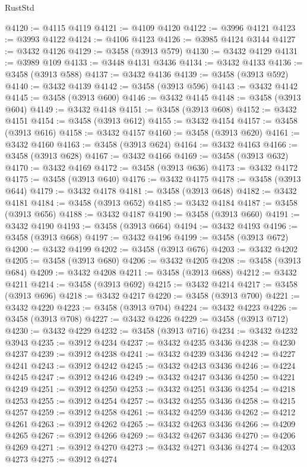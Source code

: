 \begin{lexlean}{RustStd}
\begin{coremodule}
@4120 := @4115 @4119
@4121 := @4109 @4120
@4122 := @3996 @4121
@4123 := @3993 @4122
@4124 := @4106 @4123
@4126 := @3985 @4124 @3144
@4127 := @3432 @4126
@4129 := @3458 (@3913 @579)
@4130 := @3432 @4129
@4131 := @3989 @109
@4133 := @3448 @4131 @3436
@4134 := @3432 @4133
@4136 := @3458 (@3913 @588)
@4137 := @3432 @4136
@4139 := @3458 (@3913 @592)
@4140 := @3432 @4139
@4142 := @3458 (@3913 @596)
@4143 := @3432 @4142
@4145 := @3458 (@3913 @600)
@4146 := @3432 @4145
@4148 := @3458 (@3913 @604)
@4149 := @3432 @4148
@4151 := @3458 (@3913 @608)
@4152 := @3432 @4151
@4154 := @3458 (@3913 @612)
@4155 := @3432 @4154
@4157 := @3458 (@3913 @616)
@4158 := @3432 @4157
@4160 := @3458 (@3913 @620)
@4161 := @3432 @4160
@4163 := @3458 (@3913 @624)
@4164 := @3432 @4163
@4166 := @3458 (@3913 @628)
@4167 := @3432 @4166
@4169 := @3458 (@3913 @632)
@4170 := @3432 @4169
@4172 := @3458 (@3913 @636)
@4173 := @3432 @4172
@4175 := @3458 (@3913 @640)
@4176 := @3432 @4175
@4178 := @3458 (@3913 @644)
@4179 := @3432 @4178
@4181 := @3458 (@3913 @648)
@4182 := @3432 @4181
@4184 := @3458 (@3913 @652)
@4185 := @3432 @4184
@4187 := @3458 (@3913 @656)
@4188 := @3432 @4187
@4190 := @3458 (@3913 @660)
@4191 := @3432 @4190
@4193 := @3458 (@3913 @664)
@4194 := @3432 @4193
@4196 := @3458 (@3913 @668)
@4197 := @3432 @4196
@4199 := @3458 (@3913 @672)
@4200 := @3432 @4199
@4202 := @3458 (@3913 @676)
@4203 := @3432 @4202
@4205 := @3458 (@3913 @680)
@4206 := @3432 @4205
@4208 := @3458 (@3913 @684)
@4209 := @3432 @4208
@4211 := @3458 (@3913 @688)
@4212 := @3432 @4211
@4214 := @3458 (@3913 @692)
@4215 := @3432 @4214
@4217 := @3458 (@3913 @696)
@4218 := @3432 @4217
@4220 := @3458 (@3913 @700)
@4221 := @3432 @4220
@4223 := @3458 (@3913 @704)
@4224 := @3432 @4223
@4226 := @3458 (@3913 @708)
@4227 := @3432 @4226
@4229 := @3458 (@3913 @712)
@4230 := @3432 @4229
@4232 := @3458 (@3913 @716)
@4234 := @3432 @4232 @3943
@4235 := @3912 @4234
@4237 := @3432 @4235 @3436
@4238 := @4230 @4237
@4239 := @3912 @4238
@4241 := @3432 @4239 @3436
@4242 := @4227 @4241
@4243 := @3912 @4242
@4245 := @3432 @4243 @3436
@4246 := @4224 @4245
@4247 := @3912 @4246
@4249 := @3432 @4247 @3436
@4250 := @4221 @4249
@4251 := @3912 @4250
@4253 := @3432 @4251 @3436
@4254 := @4218 @4253
@4255 := @3912 @4254
@4257 := @3432 @4255 @3436
@4258 := @4215 @4257
@4259 := @3912 @4258
@4261 := @3432 @4259 @3436
@4262 := @4212 @4261
@4263 := @3912 @4262
@4265 := @3432 @4263 @3436
@4266 := @4209 @4265
@4267 := @3912 @4266
@4269 := @3432 @4267 @3436
@4270 := @4206 @4269
@4271 := @3912 @4270
@4273 := @3432 @4271 @3436
@4274 := @4203 @4273
@4275 := @3912 @4274

\end{coremodule}
\end{lexlean}

